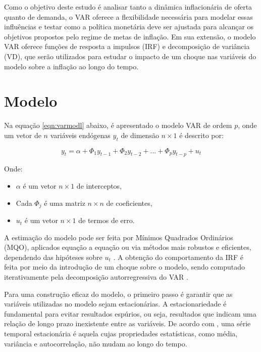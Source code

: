 \documentclass[12pt,oneside,a4paper,chapter=TITLE,english,brazil,sumario=abnt-6027-2012]{abntex2}
\begin{document}
Como o objetivo deste estudo é analisar tanto a dinâmica inflacionária de oferta quanto de demanda, o VAR oferece a flexibilidade necessária para modelar essas influências e testar como a política monetária deve ser ajustada para alcançar os objetivos propostos pelo regime de metas de inflação. Em sua extensão, o modelo VAR oferece funções de resposta a impulsos (IRF) e decomposição de variância (VD), que serão utilizados para estudar o impacto de um choque nas variáveis do modelo sobre a inflação ao longo do tempo.

\section{Modelo}

Na equação \ref{eqn:varmodl} abaixo, é apresentado o modelo VAR de ordem $p$, onde um vetor de $n$ variáveis endógenas $y_t$ de dimensão $n \times 1$ é descrito por:

\begin{equation}
	\label{eqn:varmodl}
	y_t = \alpha + \Phi_1 y_{t-1} + \Phi_2 y_{t-2} + ... + \Phi_p y_{t-p} + u_t
\end{equation}

Onde:

\begin{itemize}
	\item $\alpha$ é um vetor $n \times 1$ de interceptos,
	\item Cada $\Phi_j$ é uma matriz $n \times n$ de coeficientes,
	\item $u_t$ é um vetor $n \times 1$ de termos de erro.
\end{itemize}

A estimação do modelo pode ser feita por Mínimos Quadrados Ordinários (MQO), aplicados equação a equação ou via métodos mais robustos e eficientes, dependendo das hipóteses sobre $u_t$ \cite{hamilton_1994_time_series_analysis}. A obtenção do comportamento da IRF é feita por meio da introdução de um choque sobre o modelo, sendo computado iterativamente pela decomposição autorregressiva do VAR \cite{lutkepohl_2005_new_introduction}.

Para uma construção eficaz do modelo, o primeiro passo é garantir que as variáveis utilizadas no modelo sejam estacionárias. A estacionariedade é fundamental para evitar resultados espúrios, ou seja, resultados que indicam uma relação de longo prazo inexistente entre as variáveis. De acordo com , uma série temporal estacionária é aquela cujas propriedades estatísticas, como média, variância e autocorrelação, não mudam ao longo do tempo.
\end{document}
